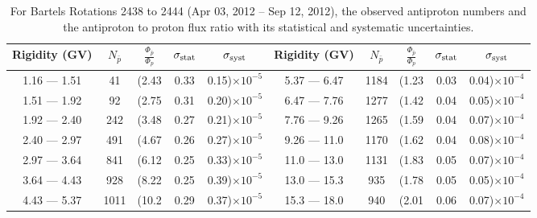 \begin{table}[p] 
\renewcommand\baselinestretch{1.3}\selectfont
\setlength\tabcolsep{3pt}
\centering
\begin{tabular}{ccccc | ccccc}
\hline
\textbf{Rigidity}  (GV)  & $N_{\bar{p}}$ & $\frac{\Phi_{\bar{p}}}{\Phi_{p}}$ & $\sigma_{\rm{stat}}$ & $\sigma_{\rm{syst}}$ \hspace{1cm}   & \textbf{Rigidity}  (GV)  & $N_{\bar{p}}$ & $\frac{\Phi_{\bar{p}}}{\Phi_{p}}$ & $\sigma_{\rm{stat}}$ & $\sigma_{\rm{syst}}$ \hspace{1cm} \\ 
\hline
1.16 — 1.51   &  41                  &(2.43                          &  0.33              &      0.15)$\times 10^{-5}$  & 5.37 — 6.47                &  1184                    &(1.23                                &  0.03                   &      0.04)$\times 10^{-4}$\\
1.51 — 1.92   &  92                  &(2.75                          &  0.31              &      0.20)$\times 10^{-5}$  & 6.47 — 7.76                &  1277                    &(1.42                                &  0.04                   &      0.05)$\times 10^{-4}$\\
1.92 — 2.40   &  242                &(3.48                          &  0.27              &      0.21)$\times 10^{-5}$  & 7.76 — 9.26                &  1265                    &(1.59                                &  0.04                   &      0.07)$\times 10^{-4}$\\    
2.40 — 2.97   &  491                &(4.67                          &  0.26              &      0.27)$\times 10^{-5}$  & 9.26 — 11.0                &  1170                    &(1.62                                &  0.04                   &      0.08)$\times 10^{-4}$\\    
2.97 — 3.64   &  841                &(6.12                          &  0.25              &      0.33)$\times 10^{-5}$  & 11.0 — 13.0                 &  1131                    &(1.83                                &  0.05                   &      0.07)$\times 10^{-4}$\\
3.64 — 4.43   &  928                &(8.22                          &  0.25              &      0.39)$\times 10^{-5}$  & 13.0 — 15.3               &  935                    &(1.78                                &  0.05                   &      0.05)$\times 10^{-4}$\\
4.43 — 5.37   &  1011              &(10.2                          &  0.29              &      0.37)$\times 10^{-5}$  & 15.3 — 18.0               &  940                    &(2.01                                &  0.06                   &      0.07)$\times 10^{-4}$\\
\hline
\end{tabular}
\caption[Antiproton to proton flux ratio for Bartels Rotations 2438 to 2444]{For Bartels Rotations 2438 to 2444 (Apr 03, 2012 – Sep 12, 2012), the observed antiproton numbers and the antiproton to proton flux ratio with its statistical and systematic uncertainties.}
\label{TableOfDependent3}
\end{table}

